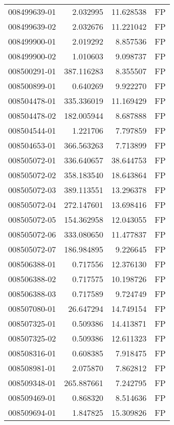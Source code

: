 \begin{tabular}{lrrl}
008499639-01 &    2.032995 &      11.628538 &   FP \\
008499639-02 &    2.032676 &      11.221042 &   FP \\
008499900-01 &    2.019292 &       8.857536 &   FP \\
008499900-02 &    1.010603 &       9.098737 &   FP \\
008500291-01 &  387.116283 &       8.355507 &   FP \\
008500899-01 &    0.640269 &       9.922270 &   FP \\
008504478-01 &  335.336019 &      11.169429 &   FP \\
008504478-02 &  182.005944 &       8.687888 &   FP \\
008504544-01 &    1.221706 &       7.797859 &   FP \\
008504653-01 &  366.563263 &       7.713899 &   FP \\
008505072-01 &  336.640657 &      38.644753 &   FP \\
008505072-02 &  358.183540 &      18.643864 &   FP \\
008505072-03 &  389.113551 &      13.296378 &   FP \\
008505072-04 &  272.147601 &      13.698416 &   FP \\
008505072-05 &  154.362958 &      12.043055 &   FP \\
008505072-06 &  333.080650 &      11.477837 &   FP \\
008505072-07 &  186.984895 &       9.226645 &   FP \\
008506388-01 &    0.717556 &      12.376130 &   FP \\
008506388-02 &    0.717575 &      10.198726 &   FP \\
008506388-03 &    0.717589 &       9.724749 &   FP \\
008507080-01 &   26.647294 &      14.749154 &   FP \\
008507325-01 &    0.509386 &      14.413871 &   FP \\
008507325-02 &    0.509386 &      12.611323 &   FP \\
008508316-01 &    0.608385 &       7.918475 &   FP \\
008508981-01 &    2.075870 &       7.862812 &   FP \\
008509348-01 &  265.887661 &       7.242795 &   FP \\
008509469-01 &    0.868320 &       8.514636 &   FP \\
008509694-01 &    1.847825 &      15.309826 &   FP \\

\end{tabular}
